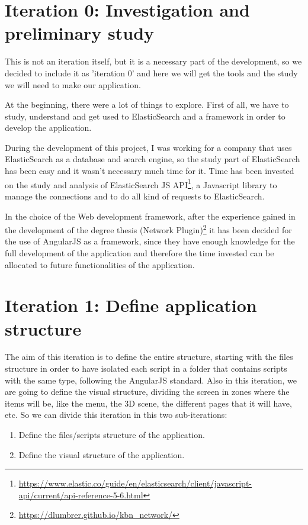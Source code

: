 \documentclass[a4paper, 12pt]{book}
\begin{document}
\section{Iteration 0: Investigation and preliminary study} 
\label{sec:it0}
This is not an iteration itself, but it is a necessary part of the development, so we decided to include it as 'iteration 0' and here we will get the tools and the study we will need to make our application. 

At the beginning, there were a lot of things to explore. First of all, we have to study, understand and get used to ElasticSearch and a framework in order to develop the application.

During the development of this project, I was working for a company that uses ElasticSearch as a database and search engine, so the study part of ElasticSearch has been easy and it wasn't necessary much time for it. Time has been invested on the study and analysis of ElasticSearch JS API\footnote{\url{https://www.elastic.co/guide/en/elasticsearch/client/javascript-api/current/api-reference-5-6.html}}, a Javascript library to manage the connections and to do all kind of requests to ElasticSearch.

In the choice of the Web development framework, after the experience gained in the development of the degree thesis (Network Plugin)\footnote{\url{https://dlumbrer.github.io/kbn_network/}} it has been decided for the use of AngularJS as a framework, since they have enough knowledge for the full development of the application and therefore the time invested can be allocated to future functionalities of the application.


\section{Iteration 1: Define application structure}
\label{sec:it1}

The aim of this iteration is to define the entire structure, starting with the files structure in order to have isolated each script in a folder that contains scripts with the same type, following the AngularJS standard. Also in this iteration, we are going to define the visual structure, dividing the screen in zones where the items will be, like the menu, the 3D scene, the different pages that it will have, etc.
So we can divide this iteration in this two sub-iterations:

\begin{enumerate}
\item Define the files/scripts structure of the application.
\item Define the visual structure of the application.
\end{enumerate}
\end{document}
